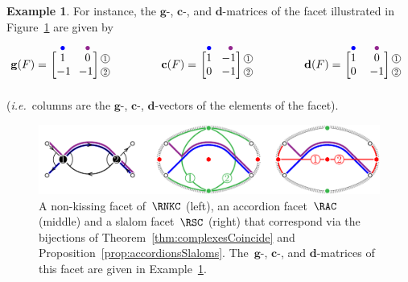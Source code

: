 \documentclass{amsart}
\theoremstyle{definition}
\newtheorem{example}[theorem]{Example}
\renewcommand{\b}[1]{\mathbf{#1}} %
\newcommand{\fref}[1]{Figure~\ref{#1}} %
\newcommand{\ie}{\textit{i.e.}~} %
\newcommand*\circled[1]{\tikz[baseline=(char.base)]{\node[shape=circle,draw,inner sep=1pt, scale=.7] (char) {#1};}}
\newcommand{\dvectors}[1]{\mathbf{d}(#1)} %
\newcommand{\gvectors}[1]{\mathbf{g}(#1)} %
\newcommand{\cvectors}[1]{\mathbf{c}(#1)} %
\begin{document}
\begin{example}
\label{exm:gcdVectorsWalks}
For instance, the $\b{g}$-, $\b{c}$-, and $\b{d}$-matrices of the facet illustrated in \fref{fig:gcdVectors} are given by
\[
\gvectors{F} = 
\begin{blockarray}{ccc}
	{\color{blue} \bullet} & {\color{violet} \bullet} & \\[-.1cm]
	\begin{block}{[cc]c}
	1 & 0 & \!\!\!\circled{1} \\
	-1\!\! & \!\!-1 & \!\!\!\circled{2} \\
	\end{block}
\end{blockarray}
\qquad\qquad
\cvectors{F} = 
\begin{blockarray}{ccc}
	{\color{blue} \bullet} & {\color{violet} \bullet} & \\[-.1cm]
	\begin{block}{[cc]c}
	1 & \!\!-1 & \!\!\!\circled{1} \\
	0 & \!\!-1 & \!\!\!\circled{2} \\
	\end{block}
\end{blockarray}
\qquad\qquad
\dvectors{F} = 
\begin{blockarray}{ccc}
	{\color{blue} \bullet} & {\color{violet} \bullet} & \\[-.1cm]
	\begin{block}{[cc]c}
	1 & 0 & \!\!\!\circled{1} \\
	0 & -1 & \!\!\!\circled{2} \\
	\end{block}
\end{blockarray}
\]
(\ie columns are the $\b{g}$-, $\b{c}$-, $\b{d}$-vectors of the elements of the facet).

\begin{figure}[t]
	\capstart
	\centerline{\includegraphics[scale=.7]{gcdVectors}}
	\caption{A non-kissing facet of~$\RNKC$ (left), an accordion facet~$\RAC$ (middle) and a slalom facet~$\RSC$ (right) that correspond via the bijections of Theorem~\ref{thm:complexesCoincide} and Proposition~\ref{prop:accordionsSlaloms}. The~$\b{g}$-, $\b{c}$-, and $\b{d}$-matrices of this facet are given in Example~\ref{exm:gcdVectorsWalks}.}
	\label{fig:gcdVectors}
\end{figure}
\end{example}
\end{document}
